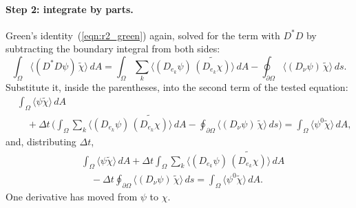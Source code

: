 \paragraph{Step 2: integrate by parts.} Green's identity~(\ref{eqn:r2_green}) again, solved for the term with $D^*D$ by subtracting the boundary integral from both sides:
\begin{equation*}
\int_\Omega \big\langle (D^*D\psi)\,\widetilde\chi\big\rangle\, dA = \int_\Omega \sum_k \big\langle (D_{e_k}\psi)\,\widetilde{(D_{e_k}\chi)}\big\rangle\, dA - \oint_{\partial\Omega} \big\langle (D_\nu\psi)\,\widetilde\chi\big\rangle\, ds .
\end{equation*}
Substitute it, inside the parentheses, into the second term of the tested equation:
\begin{align*}
&\int_\Omega \langle\psi\widetilde\chi\rangle\, dA \\
&\quad + \Delta t\,\Big(\int_\Omega \sum_k \big\langle (D_{e_k}\psi)\,\widetilde{(D_{e_k}\chi)}\big\rangle\, dA - \oint_{\partial\Omega} \big\langle (D_\nu\psi)\,\widetilde\chi\big\rangle\, ds\Big) = \int_\Omega \langle\psi^0\widetilde\chi\rangle\, dA ,
\end{align*}
and, distributing $\Delta t$,
\begin{align*}
&\int_\Omega \langle\psi\widetilde\chi\rangle\, dA + \Delta t\int_\Omega \sum_k \big\langle (D_{e_k}\psi)\,\widetilde{(D_{e_k}\chi)}\big\rangle\, dA \\
&\quad - \Delta t\oint_{\partial\Omega} \big\langle (D_\nu\psi)\,\widetilde\chi\big\rangle\, ds = \int_\Omega \langle\psi^0\widetilde\chi\rangle\, dA .
\end{align*}
One derivative has moved from $\psi$ to $\chi$.

